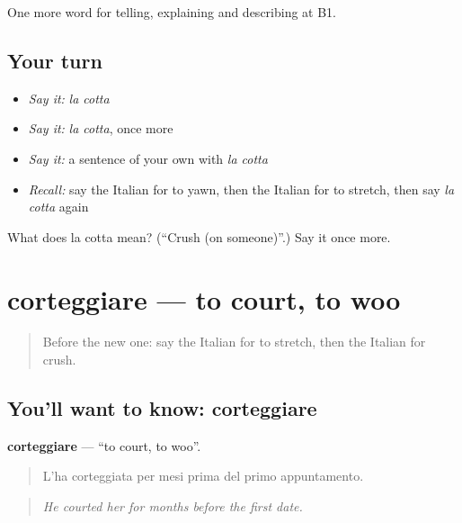 \begin{grammarlens}[title={What you've built}]
One more word for telling, explaining and describing at B1.
\end{grammarlens}

\subsection*{Your turn}
\begin{itemize}
\raggedright
  \item \emph{Say it:} \emph{la cotta}
  \item \emph{Say it:} \emph{la cotta}, once more
  \item \emph{Say it:} a sentence of your own with \emph{la cotta}
  \item \emph{Recall:} say the Italian for to yawn, then the Italian for to stretch, then say \emph{la cotta} again
\end{itemize}

\begin{tcolorbox}[breakable,colback=teal!4,colframe=teal!35!black,title={Before you move on}]
What does la cotta mean? (\textquotedblleft{}Crush (on someone)\textquotedblright{}.) Say it once more.
\end{tcolorbox}
\section[corteggiare]{corteggiare — to court, to woo}

\label{lesson:IT-C491-corteggiare}



\begin{quote}
Before the new one: say the Italian for to stretch, then the Italian for crush.
\end{quote}

\subsection*{You'll want to know: corteggiare}
\textbf{corteggiare} — \textquotedblleft{}to court, to woo\textquotedblright{}.

\begin{quote}
L'ha corteggiata per mesi prima del primo appuntamento.
\end{quote}

\begin{quote}
\emph{He courted her for months before the first date.}
\end{quote}

